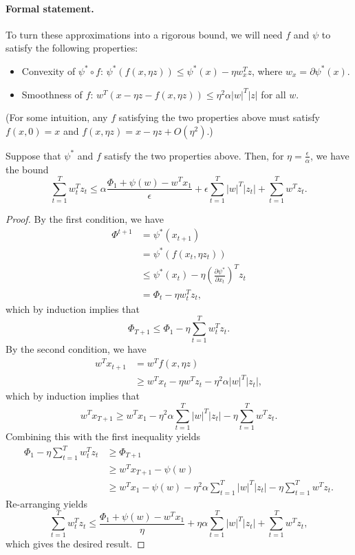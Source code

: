 \documentclass[11pt]{article}
\begin{document}
\paragraph{Formal statement.} To turn these approximations into a rigorous bound, we will 
need $f$ and $\psi$ to satisfy the following properties:
\begin{itemize}
\item Convexity of $\psi^* \circ f$: $\psi^*(f(x,\eta z)) \leq \psi^*(x) - \eta w_x^Tz$, where $w_x = \partial \psi^*(x)$.
\item Smoothness of $f$: $w^T(x-\eta z - f(x,\eta z)) \leq \eta^2 \alpha |w|^T|z|$ for all $w$.
\end{itemize}
(For some intuition, any $f$ satisfying the two properties above 
must satisfy $f(x,0) = x$ and $f(x,\eta z) = x-\eta z + O(\eta^2)$.)
\begin{theorem}
\label{thm:main}
Suppose that $\psi^*$ and $f$ satisfy the two properties above. Then, 
for $\eta = \frac{\epsilon}{\alpha}$, we have the bound
\[ \sum_{t=1}^T w_t^Tz_t \leq \alpha \frac{\Phi_1 + \psi(w) - w^Tx_1}{\epsilon} + \epsilon \sum_{t=1}^T |w|^T|z_t| + \sum_{t=1}^T w^Tz_t. \]
\end{theorem}
\begin{proof}
By the first condition, we have
\begin{align*}
\Phi^{t+1} &= \psi^*(x_{t+1}) \\
 &= \psi^*(f(x_t, \eta z_t)) \\
 &\leq \psi^*(x_t) - \eta \left(\frac{\partial \psi^*}{\partial x_t}\right)^T z_t \\
 &= \Phi_t - \eta w_t^T z_t,
\end{align*}
which by induction implies that
\[ \Phi_{T+1} \leq \Phi_1 - \eta \sum_{t=1}^T w_t^Tz_t. \]
By the second condition, we have
\begin{align*}
w^Tx_{t+1} &= w^Tf(x, \eta z) \\
 &\geq w^Tx_t - \eta w^Tz_t - \eta^2 \alpha |w|^T|z_t|,
\end{align*}
which by induction implies that
\[ w^Tx_{T+1} \geq w^Tx_1 - \eta^2\alpha \sum_{t=1}^T |w|^T|z_t| - \eta \sum_{t=1}^T w^Tz_t. \]
Combining this with the first inequality yields
\begin{align*}
\Phi_1 - \eta \sum_{t=1}^T w_t^Tz_t &\geq \Phi_{T+1} \\
 &\geq w^Tx_{T+1} - \psi(w) \\
 &\geq w^Tx_1 - \psi(w) - \eta^2\alpha \sum_{t=1}^T |w|^T|z_t| - \eta \sum_{t=1}^T w^Tz_t.
\end{align*}
Re-arranging yields
\[ \sum_{t=1}^T w_t^Tz_t \leq \frac{\Phi_1 + \psi(w) - w^Tx_1}{\eta} + \eta\alpha \sum_{t=1}^T |w|^T|z_t| + \sum_{t=1}^T w^Tz_t, \]
which gives the desired result.
\end{proof}
\end{document}
